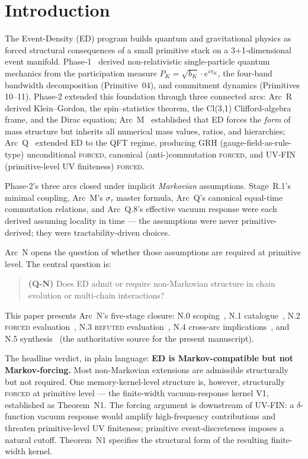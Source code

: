 \documentclass[11pt,a4paper]{article}
\begin{document}
\section{Introduction}

The Event-Density (ED) program builds quantum and gravitational physics as forced structural consequences of a small primitive stack on a 3+1-dimensional event manifold. Phase-1~\cite{phase1} derived non-relativistic single-particle quantum mechanics from the participation measure $P_K = \sqrt{b_K} \cdot e^{i\pi_K}$, the four-band bandwidth decomposition (Primitive~04), and commitment dynamics (Primitives 10--11). Phase-2 extended this foundation through three connected arcs: Arc~R~\cite{arcr} derived Klein--Gordon, the spin--statistics theorem, the Cl(3,1) Clifford-algebra frame, and the Dirac equation; Arc~M~\cite{arcm} established that ED forces the \emph{form} of mass structure but inherits all numerical mass values, ratios, and hierarchies; Arc~Q~\cite{arcq} extended ED to the QFT regime, producing GRH (gauge-field-as-rule-type) unconditional \textsc{forced}, canonical (anti-)commutation \textsc{forced}, and UV-FIN (primitive-level UV finiteness) \textsc{forced}.

Phase-2's three arcs closed under implicit \emph{Markovian} assumptions. Stage~R.1's minimal coupling, Arc~M's $\sigma_\tau$ master formula, Arc~Q's canonical equal-time commutation relations, and Arc~Q.8's effective vacuum response were each derived assuming locality in time --- the assumptions were never primitive-derived; they were tractability-driven choices.

Arc~N opens the question of whether those assumptions are required at primitive level. The central question is:
\begin{quote}
\textbf{(Q-N)} Does ED admit or require non-Markovian structure in chain evolution or multi-chain interactions?
\end{quote}

This paper presents Arc~N's five-stage closure: N.0 scoping~\cite{n0}, N.1 catalogue~\cite{n1}, N.2 \textsc{forced} evaluation~\cite{n2}, N.3 \textsc{refuted} evaluation~\cite{n3}, N.4 cross-arc implications~\cite{n4}, and N.5 synthesis~\cite{n5} (the authoritative source for the present manuscript).

The headline verdict, in plain language: \textbf{ED is Markov-compatible but not Markov-forcing.} Most non-Markovian extensions are admissible structurally but not required. One memory-kernel-level structure is, however, structurally \textsc{forced} at primitive level --- the finite-width vacuum-response kernel V1, established as Theorem~N1. The forcing argument is downstream of UV-FIN: a $\delta$-function vacuum response would amplify high-frequency contributions and threaten primitive-level UV finiteness; primitive event-discreteness imposes a natural cutoff. Theorem~N1 specifies the structural form of the resulting finite-width kernel.
\end{document}
